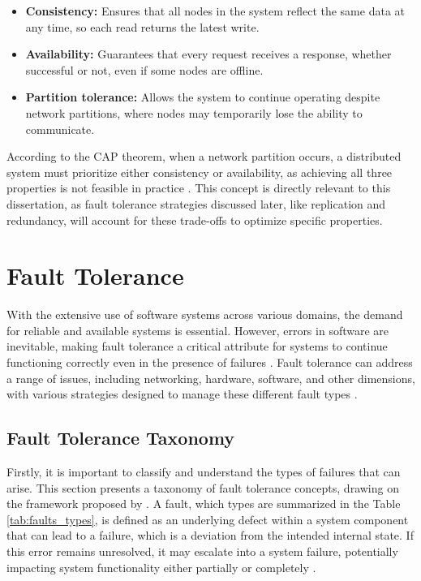 \begin{itemize}
    \item \textbf{Consistency:} Ensures that all nodes in the system reflect the same data at any time, so each read returns the latest write.
    \item \textbf{Availability:} Guarantees that every request receives a response, whether successful or not, even if some nodes are offline.
    \item \textbf{Partition tolerance:} Allows the system to continue operating despite network partitions, where nodes may temporarily lose the ability to communicate.
\end{itemize}

According to the CAP theorem, when a network partition occurs, a distributed system must prioritize either consistency or availability, as achieving all three properties is not feasible in practice \cite{Tanenbaum2023, ibm-cap-theorem, Vitillo2021}. This concept is directly relevant to this dissertation, as fault tolerance strategies discussed later, like replication and redundancy, will account for these trade-offs to optimize specific properties.


\section{Fault Tolerance}

With the extensive use of software systems across various domains, the demand for reliable and available systems is essential. However, errors in software are inevitable, making fault tolerance a critical attribute for systems to continue functioning correctly even in the presence of failures \cite{Sari2015}. Fault tolerance can address a range of issues, including networking, hardware, software, and other dimensions, with various strategies designed to manage these different fault types \cite{Tanenbaum2023,Noor2019}.

\subsection{Fault Tolerance Taxonomy}

Firstly, it is important to classify and understand the types of failures that can arise. This section presents a taxonomy of fault tolerance concepts, drawing on the framework proposed by \textcite{Isukapalli2024}. A fault, which types are summarized in the Table \ref{tab:faults_types}, is defined as an underlying defect within a system component that can lead to a failure, which is a deviation from the intended internal state. If this error remains unresolved, it may escalate into a system failure, potentially impacting system functionality either partially or completely \cite{Isukapalli2024,Reghenzani2023}.

